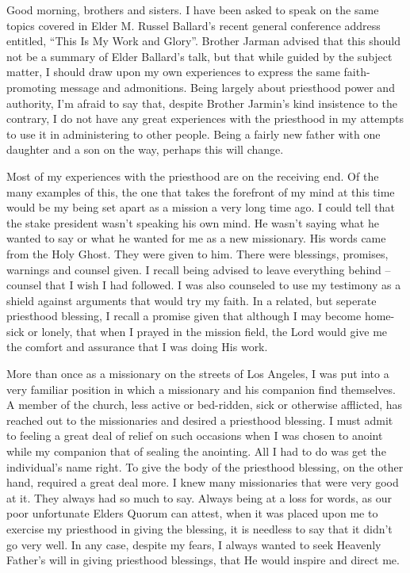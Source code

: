 \documentclass[12pt]{article}
\begin{document}
Good morning, brothers and sisters.  I have been asked to speak on the same topics
covered in Elder M. Russel Ballard's recent general conference address entitled,
``This Is My Work and Glory''.  Brother Jarman advised that this should not be a summary
of Elder Ballard's talk, but that while guided by the subject matter, I should draw
upon my own experiences to express the same faith-promoting message and admonitions.
Being largely about priesthood power and authority, I'm afraid to say that, despite
Brother Jarmin's kind insistence to the contrary, I do not have any great experiences with
the priesthood in my attempts to use it in administering to other people.  Being a fairly
new father with one daughter and a son on the way, perhaps this will change.

Most of my experiences with the priesthood are on the receiving end.  Of the many examples of
this, the one that takes the forefront of my mind at this time would be my being set apart as a
mission a very long time ago.  I could tell that the stake president wasn't speaking his own
mind.  He wasn't saying what he wanted to say or what he wanted for me as a new missionary.
His words came from the Holy Ghost.  They were given to him.  There were blessings, promises, warnings
and counsel given.  I recall being advised to leave everything behind -- counsel that I
wish I had followed.  I was also counseled to use my testimony as a shield against arguments
that would try my faith.  In a related, but seperate priesthood blessing, I recall a promise given that
although I may become home-sick or lonely,
that when I prayed in the mission field, the Lord would give me the comfort and assurance that I was doing His work.

More than once as a missionary on the streets of Los Angeles, I was put into a
very familiar position in which a missionary and his companion find themselves.
A member of the church, less active or bed-ridden, sick or otherwise afflicted,
has reached out to the missionaries and desired a priesthood blessing.  I must admit
to feeling a great deal of relief on such occasions when I was chosen to anoint while
my companion that of sealing the anointing.  All I had to do was get the individual's name right.
To give the body of the priesthood blessing, on the other hand, required a great
deal more.  I knew many missionaries that were very good at it.  They always
had so much to say.  Always being at a loss for words, as our poor unfortunate
Elders Quorum can attest, when it was placed upon me to exercise my priesthood in
giving the blessing, it is needless to say that it didn't go very well.  In any case,
despite my fears, I always wanted to seek Heavenly Father's will in giving priesthood
blessings, that He would inspire and direct me.
\end{document}
